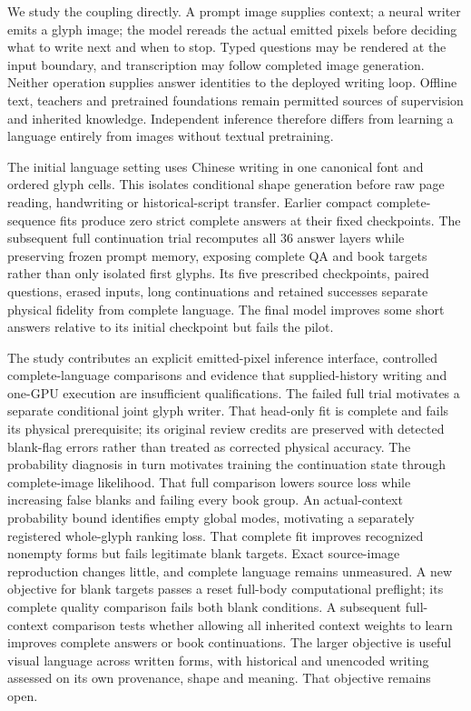 We study the coupling directly. A prompt image supplies context; a neural
writer emits a glyph image; the model rereads the actual emitted pixels before
deciding what to write next and when to stop. Typed questions may be rendered
at the input boundary, and transcription may follow completed image generation.
Neither operation supplies answer identities to the deployed writing loop.
Offline text, teachers and pretrained foundations remain permitted sources of
supervision and inherited knowledge. Independent inference therefore differs
from learning a language entirely from images without textual pretraining.

The initial language setting uses Chinese writing in one canonical font and
ordered glyph cells. This isolates conditional shape generation before raw
page reading, handwriting or historical-script transfer. Earlier compact
complete-sequence fits produce zero strict complete answers at their fixed
checkpoints. The subsequent full continuation trial recomputes all 36 answer
layers while preserving frozen prompt memory, exposing complete QA and book
targets rather than only isolated first glyphs. Its five prescribed checkpoints,
paired questions, erased inputs, long continuations and retained successes
separate physical fidelity from complete language. The final model improves
some short answers relative to its initial checkpoint but fails the pilot.

The study contributes an explicit emitted-pixel inference interface, controlled
complete-language comparisons and evidence that supplied-history writing and
one-GPU execution are insufficient qualifications. The failed full trial
motivates a separate conditional joint glyph writer. That head-only fit is
complete and fails its physical prerequisite; its original review credits
are preserved with detected blank-flag errors rather than treated as corrected
physical accuracy. The probability diagnosis in turn motivates training the
continuation state through complete-image likelihood. That full comparison
lowers source loss while increasing false blanks and failing every book group.
An actual-context probability bound identifies empty global modes, motivating
a separately registered whole-glyph ranking loss. That complete fit improves
recognized nonempty forms but fails legitimate blank targets. Exact source-image
reproduction changes little, and complete language remains unmeasured. A new
objective for blank targets passes a reset full-body computational preflight;
its complete quality comparison fails both blank conditions. A subsequent
full-context comparison tests whether allowing all inherited context weights to learn improves complete answers or book continuations.
The larger objective is useful
visual language across written forms, with historical and unencoded writing
assessed on its own provenance, shape and meaning. That objective remains open.

